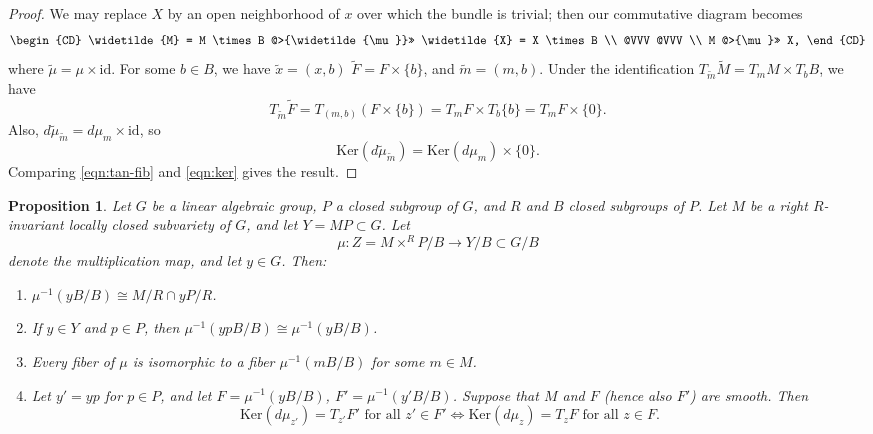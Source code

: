 \documentclass[11pt,letterpaper,reqno]{amsart}
\numberwithin{equation}{section}
\theoremstyle{plain}
\newtheorem{proposition}[theorem]{Proposition}
\theoremstyle{definition}
\theoremstyle{remark}
\begin{document}
\begin{proof}
We may replace $X$ by an open neighborhood of $x$ over which the bundle is trivial; then our commutative diagram becomes
$$
\begin{CD}
\widetilde{M} = M \times B @>{\widetilde{\mu}}>> \widetilde{X} = X \times B \\
@VVV @VVV \\
M @>{\mu}>> X,
\end{CD}
$$
where $\widetilde{\mu}=\mu\times \mbox{id}$.
For some $b \in B$, we have $\widetilde{x} = (x, b)$  $\widetilde{F} = F \times \{ b \}$, and $\widetilde{m} = (m,b)$.
Under the identification
 $T_{\widetilde{m}} \widetilde{M} = T_m M \times T_b B$, we have
 \begin{equation}\label{eqn:tan-fib}
 T_{\widetilde{m}}\widetilde{F}=T_{(m,b)}(F \times \{ b \})=T_mF\times T_b\{b\}=T_mF\times\{0\}.
\end{equation}
 Also, $d\widetilde{\mu}_{\widetilde{m}}=d\mu_m\times\mbox{id}$,
 so
 \begin{equation}\label{eqn:ker}
\mathrm{Ker}(d\widetilde{\mu}_{\widetilde{m}})= \mathrm{Ker}(d\mu_m) \times \{ 0 \}.
\end{equation}
Comparing \eqref{eqn:tan-fib} and \eqref{eqn:ker} gives the result.
\end{proof}
 
\begin{proposition} \label{p:fiber-general}
Let $G$ be a linear algebraic group, $P$ a closed subgroup of $G$, and $R$ and $B$ closed subgroups of $P$.
Let $M$ be a right $R$-invariant locally closed subvariety of $G$,
and let $Y = MP \subset G$.
Let 
$$
\mu: Z = M \times^R P/B \to Y/B \subset G/B
$$ 
denote the multiplication map, and let $y \in G$.  Then:
\begin{enumerate}
\item $\mu^{-1}(yB/B) \cong M/R \cap yP/R$.
\item If $y \in Y$ and $p \in P$, then $\mu^{-1}(ypB/B) \cong \mu^{-1}(yB/B)$.
\item Every fiber of $\mu$ is isomorphic to a fiber $\mu^{-1}(mB/B)$ for some $m \in M$.  
\item Let $y' = yp$ for $p \in P$, and let $F = \mu^{-1}(yB/B)$, $F' =  \mu^{-1}(y'B/B)$.
Suppose that $M$ and $F$ (hence also $F'$) are smooth.  Then
$$
\mathrm{Ker}(d\mu_{z'})=T_{z'} F' \mbox{ for all } z' \in F' \Leftrightarrow \mathrm{Ker}(d\mu_{z})=T_{z} F \mbox{ for all } z \in F. 
$$
\end{enumerate}
\end{proposition}
\end{document}
